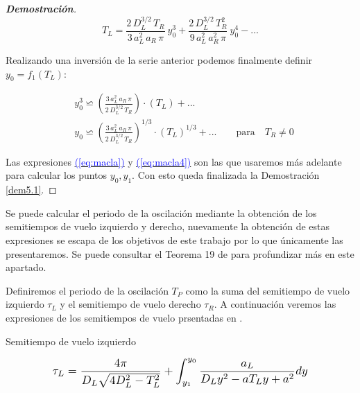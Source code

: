 \documentclass[12pt,a4paper]{report} %
\newcommand{\eref}[1]{\hyperref[#1]{\textcolor{blue}{(\ref*{#1})}}}
\newcommand{\eref}[1]{\hyperref[#1]{\textcolor{blue}{\textit{(\ref*{#1})}}}}
\begin{document}
\begin{proof}[\textbf{Demostración}]
	\begin{equation}
		\label{macla3}
		T_L=\frac{2\, D_L^{3/2}\, T_R}{3\, a_L^2\, a_R \, \pi}\: y_0^3+\frac{2\, D_L^{3/2}\, T_R^2}{9\, a_L^2\, a_R^2 \, \pi}\: y_0^4-...
	\end{equation}\smallskip
	
	\vspace{0.5cm}\noindent Realizando una inversión de la serie  anterior podemos finalmente definir $y_0=f_1(T_L)$:
	
	\begin{equation}
		\label{eq:macla4}
		\begin{aligned}
		&y_0^3\backsimeq \left( \frac{3\, a_L^2\, a_R \, \pi}{2\, D_L^{3/2}\, T_R} \right)\cdot \left(T_L\right)+...\\[3mm]
		&y_0\backsimeq \left( \frac{3\, a_L^2\, a_R \, \pi}{2\, D_L^{3/2}\, T_R} \right)^{1/3}\cdot \left(T_L\right)^{1/3}+... \qquad \text{para} \quad T_R \neq 0
	\end{aligned}
	\end{equation}
	
	\vspace{0.5cm}Las expresiones \eref{eq:macla} y \eref{eq:macla4} son las que usaremos más adelante para calcular los puntos $y_0,y_1$. Con esto queda finalizada la Demostración \ref{dem5.1}.
	
	\end{proof}
	
	\vspace{0.5cm}Se puede calcular el periodo de la oscilación mediante la obtención de los semitiempos de vuelo izquierdo y derecho, nuevamente la obtención de estas expresiones se escapa de los objetivos de este trabajo por lo que  únicamente las presentaremos. Se puede consultar el Teorema 19 de \cite{caracterizacion} para profundizar más en este apartado.
	
	\vspace{0.5cm} Definiremos el periodo de la oscilación $T_P$ como la suma del semitiempo de vuelo izquierdo $\tau_L$ y el semitiempo de vuelo derecho $\tau_R$. A continuación veremos las expresiones de los semitiempos de vuelo prsentadas en \cite{caracterizacion}.
	
	\vspace{0.5cm}\noindent Semitiempo de vuelo izquierdo
	
	\begin{equation}
		\label{eq:semitiempoL}
		\scalebox{1.2}{$\displaystyle
		\tau_L=\frac{4\pi}{D_L\sqrt{4D_L^2-T_L^2}}+\int_{y_1}^{y_0}\frac{a_L}{D_Ly^2-aT_Ly+a^2}dy
		$}
	\end{equation}\smallskip
	
\end{document}
